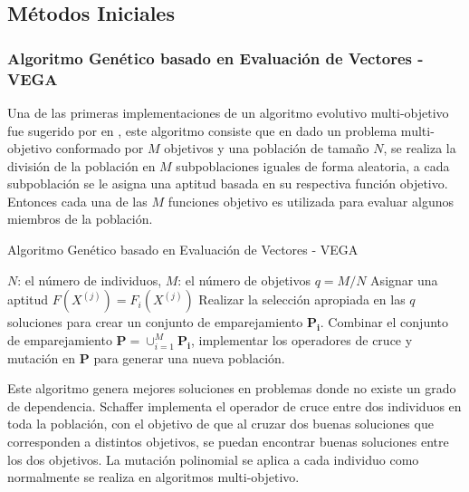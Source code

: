 \subsection{Métodos Iniciales}


\subsubsection{Algoritmo Genético basado en Evaluación de Vectores - VEGA}
Una de las primeras implementaciones de un algoritmo evolutivo multi-objetivo fue sugerido por  \citeauthor{Joel:VEGA} en \citeyear{Joel:VEGA}, este algoritmo consiste que en dado un problema multi-objetivo conformado por $M$ objetivos y una población de tamaño $N$, se realiza la divisi\'on de la población en $M$ subpoblaciones iguales de forma aleatoria, a cada subpoblación se le asigna una aptitud basada en su respectiva función objetivo. Entonces cada una de las $M$ funciones objetivo es utilizada para evaluar algunos miembros de la población.
\begin{algorithm}[H]
  \scriptsize
	\caption{Algoritmo Genético basado en Evaluación de Vectores - VEGA} 
	\begin{algorithmic}[1]
    \STATE $N$: el n\'umero de individuos, $M$: el n\'umero de objetivos
    \STATE $q=M/N$
    	 \STATE Asignar una aptitud $F(X^{(j)})=F_i(X^{(j)})$
       \ENDFOR
    \STATE Realizar la selección apropiada en las $q$ soluciones para crear un conjunto de emparejamiento $\mathbf{P_i}$.
    \ENDFOR
    \STATE Combinar el conjunto de emparejamiento $\mathbf{P} = \cup_{i=1}^M \mathbf{P_i}$, implementar los operadores de cruce y mutación en $\mathbf{P}$ para generar una nueva población.
    \end{algorithmic}
    \label{alg1}
\end{algorithm}
Este algoritmo genera mejores soluciones en problemas donde no existe un grado de dependencia.
%
Schaffer implementa el operador de cruce entre dos individuos en toda la población, con el objetivo de que al cruzar dos buenas soluciones que corresponden a distintos objetivos, se puedan encontrar buenas soluciones entre los dos objetivos.
%
La mutación polinomial se aplica a cada individuo como normalmente se realiza en algoritmos multi-objetivo.
